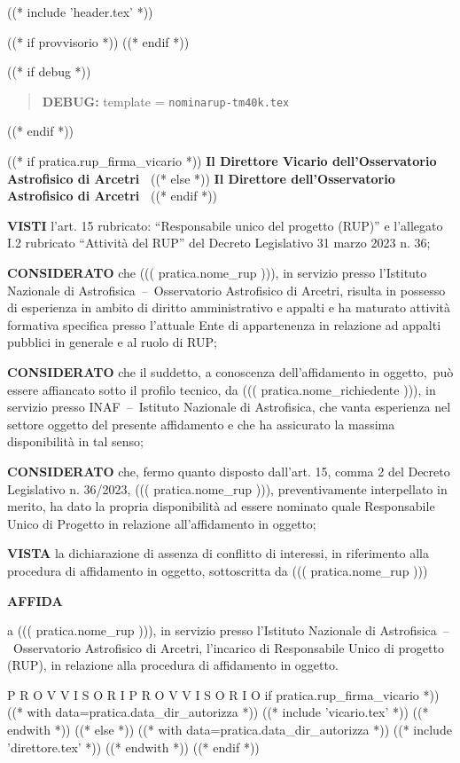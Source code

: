 
((* include 'header.tex' *))

((* if provvisorio *))
((* endif *))


\topaddr
((* if debug *))
\begin{quotation}
	\textbf{DEBUG:} template = \texttt{nominarup-tm40k.tex}
\end{quotation}
((* endif *))

\begin{center}
((* if pratica.rup_firma_vicario *))
\textbf{Il Direttore Vicario dell’Osservatorio Astrofisico di Arcetri }
((* else *))
\textbf{Il Direttore dell’Osservatorio Astrofisico di Arcetri }
((* endif *))
\end{center}

\textbf{VISTI}	l’art. 15 rubricato: ``Responsabile unico del progetto (RUP)'' e l’allegato I.2 rubricato
``Attività del RUP'' del Decreto Legislativo 31 marzo 2023 n. 36;

\textbf{CONSIDERATO} 	che ((( pratica.nome_rup ))), in servizio presso l’Istituto Nazionale di
Astrofisica~–~Osservatorio Astrofisico di Arcetri, risulta in possesso di esperienza in ambito di diritto
amministrativo e appalti e ha maturato attività formativa specifica presso l’attuale Ente di appartenenza
in relazione ad appalti pubblici in generale e al ruolo di RUP;

\textbf{CONSIDERATO} che il suddetto, a conoscenza dell’affidamento in oggetto, può essere affiancato sotto il
profilo tecnico, da ((( pratica.nome_richiedente ))), in servizio presso INAF~–~Istituto Nazionale di
Astrofisica, che vanta esperienza nel settore oggetto del presente affidamento e che ha assicurato la
massima disponibilità in tal senso;

\textbf{CONSIDERATO} 	che, fermo quanto disposto dall’art. 15, comma 2 del Decreto Legislativo n. 36/2023,
((( pratica.nome_rup ))), preventivamente interpellato in merito, ha dato la propria disponibilità ad
essere nominato quale Responsabile Unico di Progetto in relazione all’affidamento in oggetto;

\textbf{VISTA}	la dichiarazione di assenza di conflitto di interessi, in riferimento alla procedura di affidamento
in oggetto, sottoscritta da ((( pratica.nome_rup )))

\begin{center}
	\textbf{AFFIDA}
\end{center}

a ((( pratica.nome_rup ))), in servizio presso l’Istituto Nazionale di Astrofisica~–~Osservatorio
Astrofisico di Arcetri, l’incarico di Responsabile Unico di progetto (RUP), in relazione alla procedura
di affidamento in oggetto.

P R O V V I S O R I P R O V V I S O R I O if pratica.rup_firma_vicario *))
((* with data=pratica.data_dir_autorizza *))
((* include 'vicario.tex' *))
((* endwith *))
((* else *))
((* with data=pratica.data_dir_autorizza *))
((* include 'direttore.tex' *))
((* endwith *))
((* endif *))

